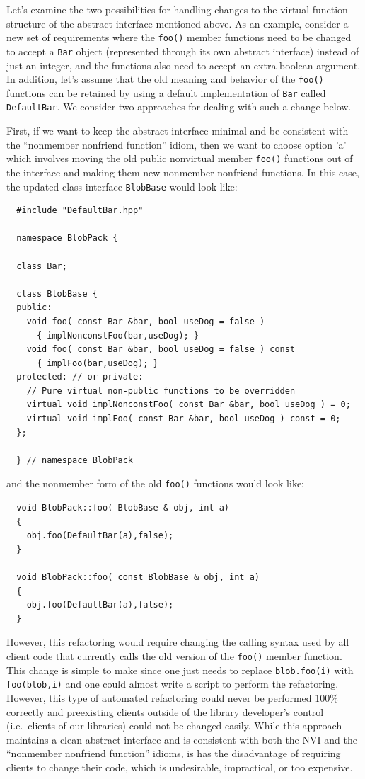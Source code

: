 \documentclass[pdf,ps2pdf,11pt]{SANDreport}
\begin{document}
Let's examine the two possibilities for handling changes to the virtual
function structure of the abstract interface mentioned above.  As an example,
consider a new set of requirements where the {}\texttt{foo()} member functions
need to be changed to accept a {}\texttt{Bar} object (represented through its
own abstract interface) instead of just an integer, and the functions also
need to accept an extra boolean argument.  In addition, let's assume that the
old meaning and behavior of the {}\texttt{foo()} functions can be retained by
using a default implementation of {}\texttt{Bar} called {}\texttt{DefaultBar}.
We consider two approaches for dealing with such a change below.

First, if we want to keep the abstract interface minimal and be consistent
with the ``nonmember nonfriend function'' idiom, then we want to choose option
'a' which involves moving the old public nonvirtual member {}\texttt{foo()}
functions out of the interface and making them new nonmember nonfriend
functions.  In this case, the updated class interface {}\texttt{BlobBase}
would look like:

{\small\begin{verbatim}
  #include "DefaultBar.hpp"

  namespace BlobPack {

  class Bar;

  class BlobBase {
  public:
    void foo( const Bar &bar, bool useDog = false )
      { implNonconstFoo(bar,useDog); }
    void foo( const Bar &bar, bool useDog = false ) const
      { implFoo(bar,useDog); }
  protected: // or private:
    // Pure virtual non-public functions to be overridden
    virtual void implNonconstFoo( const Bar &bar, bool useDog ) = 0;
    virtual void implFoo( const Bar &bar, bool useDog ) const = 0;
  };

  } // namespace BlobPack
\end{verbatim}}

{}\noindent{}and the nonmember form of the old {}\texttt{foo()} functions
would look like:

{\small\begin{verbatim}
  void BlobPack::foo( BlobBase & obj, int a)
  {
    obj.foo(DefaultBar(a),false);
  }

  void BlobPack::foo( const BlobBase & obj, int a)
  {
    obj.foo(DefaultBar(a),false);
  }
\end{verbatim}}

However, this refactoring would require changing the calling syntax used by
all client code that currently calls the old version of the {}\texttt{foo()}
member function.  This change is simple to make since one just needs to
replace {}\texttt{blob.foo(i)} with {}\texttt{foo(blob,i)} and one could
almost write a script to perform the refactoring.  However, this type of
automated refactoring could never be performed 100\% correctly and preexisting
clients outside of the library developer's control (i.e.\ clients of our
libraries) could not be changed easily.  While this approach maintains a clean
abstract interface and is consistent with both the NVI and the ``nonmember
nonfriend function'' idioms, is has the disadvantage of requiring clients to
change their code, which is undesirable, impractical, or too expensive.
\end{document}
